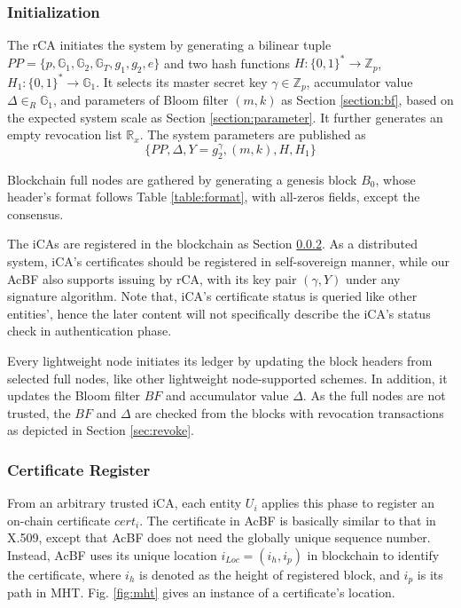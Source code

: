 \documentclass[conference]{IEEEtran}
\begin{document}
\subsubsection{Initialization}
The rCA initiates the system by generating a bilinear tuple $PP=\{p, \mathbb{G}_1, \mathbb{G}_2, \mathbb{G}_T, g_1, g_2, e\}$ and two hash functions $H:\{0, 1\}^* \rightarrow \mathbb{Z}_p$, $H_1:\{0, 1\}^* \rightarrow \mathbb{G}_1$. It selects its master secret key $\gamma\in \mathbb{Z}_p$, accumulator value $\Delta\in_R \mathbb{G}_1$, 
and parameters of Bloom filter $(m, k)$ as Section \ref{section:bf}, based on the expected system scale as Section \ref{section:parameter}. It further generates an empty revocation list $\mathbb{R}_x$. The system parameters are published as 
$$ \bigl\{ PP, \Delta, Y = g_2^\gamma, (m, k), H, H_1 \bigr\}$$

Blockchain full nodes are gathered by generating a genesis block $B_0$, whose header's format follows Table \ref{table:format}, with all-zeros fields, except the consensus. 

The iCAs are registered in the blockchain as Section \ref{section:register}. As a distributed system, iCA's certificates should be registered in self-sovereign manner, while our AcBF also supports issuing by rCA, with its key pair $(\gamma, Y)$ under any signature algorithm. Note that, iCA's certificate status is queried like other entities', hence the later content will not specifically describe the iCA's status check in authentication phase. 


Every lightweight node initiates its ledger by updating the block headers from selected full nodes, like other lightweight node-supported schemes. In addition, it updates the Bloom filter $BF$ and accumulator value $\Delta$. As the full nodes are not trusted, the $BF$ and $\Delta$ are checked from the blocks with revocation transactions as depicted in Section \ref{sec:revoke}.

\subsubsection{Certificate Register}\label{section:register}
From an arbitrary trusted iCA, each entity $U_i$ applies this phase to register an on-chain certificate $cert_i$. The certificate in AcBF is basically similar to that in X.509, except that AcBF does not need the globally unique sequence number. Instead, AcBF uses its unique location $i_{Loc} = (i_h, i_p)$ in blockchain to identify the certificate, where $i_h$ is denoted as the height of registered block, and $i_p$ is its path in MHT. Fig. \ref{fig:mht} gives an instance of a certificate's location. 
\end{document}
